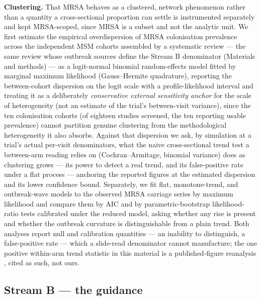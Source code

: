 \documentclass[10pt,letterpaper]{article}
\begin{document}
\textbf{Clustering.} That MRSA behaves as a clustered, network
phenomenon rather than a quantity a cross-sectional proportion can
settle is instrumented separately and kept MRSA-scoped, since MRSA is a
subset and not the analytic unit. We first estimate the empirical
overdispersion of MRSA colonisation prevalence across the independent
MSM cohorts assembled by a systematic review \cite{dejong2025} --- the
same review whose outbreak sources define the Stream B denominator
(Materials and methods) --- as a logit-normal binomial random-effects
model fitted by marginal maximum likelihood (Gauss--Hermite quadrature),
reporting the between-cohort dispersion on the logit scale with a
profile-likelihood interval and treating it as a deliberately
\emph{conservative external sensitivity anchor} for the scale of
heterogeneity (not an estimate of the trial's between-visit variance),
since the ten colonisation cohorts (of eighteen studies screened, the
ten reporting usable prevalence) cannot partition genuine clustering
from the methodological heterogeneity it also absorbs. Against that
dispersion we ask, by simulation at a trial's actual per-visit
denominators, what the naive cross-sectional trend test a between-arm
reading relies on (Cochran--Armitage, binomial variance) does as
clustering grows --- its power to detect a real trend, and its
false-positive rate under a flat process --- anchoring the reported
figures at the estimated dispersion and its lower confidence bound.
Separately, we fit flat, monotone-trend, and outbreak-wave models to the
observed MRSA carriage series by maximum likelihood and compare them by
AIC and by parametric-bootstrap likelihood-ratio tests calibrated under
the reduced model, asking whether any rise is present and whether the
outbreak curvature is distinguishable from a plain trend. Both analyses
report null and calibration quantities --- an inability to distinguish,
a false-positive rate --- which a slide-read denominator cannot
manufacture; the one positive within-arm trend statistic in this
material is a published-figure reanalysis \cite{vanbaelen2024c}, cited
as such, not ours.

\subsection*{Stream B --- the guidance}
\end{document}
